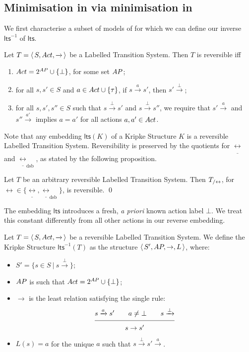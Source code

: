 \documentclass{llncs}
\newcommand{\sosrule}[2]{\frac{\raisebox{.7ex}{\normalsize{$#1$}}}
                        {\raisebox{-1.0ex}{\normalsize{$#2$}}}}
\newcommand{\ltstrans}[1]{\xrightarrow{#1}}
\newcommand{\kstrans}{\to}
\newcommand{\bisim}{\mbox{$\underline{\leftrightarrow}$}}
\newcommand{\dsbbisim}{\mbox{$\underline{\leftrightarrow}_{\mathrm{dsb}}$}}
\newcommand{\lts}{\mathsf{lts}}
\newcommand{\ltsrev}{\lts^{-1}}
\begin{document}
\subsection{Minimisation in \KS via minimisation in \LTS}


We first characterise a subset of models of \LTS for which we can
define our inverse $\ltsrev$ of $\lts$.

\begin{definition}
Let $T = \tuple{S, \act, \ltstrans{}}$ be a Labelled Transition System.
Then $T$ is reversible iff
\begin{enumerate}
\item $Act = 2^{AP} \cup \{\bot\}$, for some set $AP$;

\item for all $s,s'\in S$ and $a \in Act \cup \{\tau\}$,
if $s \ltstrans{a} s'$, then $s'\ltstrans{\bot}$;

\item for all $s,s',s'' \in S$ such that $s \ltstrans{\bot} s'$ and
$s \ltstrans{\bot} s''$, we require that
$s' \ltstrans{a}$ and $s'' \ltstrans{a'}$ implies $a = a'$ for all
actions $a,a' \in Act$.

\end{enumerate}
\end{definition}
Note that any embedding $\lts(K)$ of a Kripke Structure $K$
is a reversible Labelled Transition System. Reversibility
is preserved by the quotients for $\bisim$ and $\dsbbisim$,
as stated by the following proposition.
\begin{proposition}
\label{prop:reversibility}
Let $T$ be an arbitrary reversible Labelled Transition
System. Then ${T}_{/\leftrightarrow}$, for $\leftrightarrow {} \in \{\bisim, \dsbbisim\}$,
is reversible. \qed

\end{proposition}
The embedding $\lts$
introduces a fresh, \emph{a priori} known action label $\bot$.
We treat this constant differently from all other actions in
our reverse embedding.
\begin{definition}
\label{translationltsreverse}
Let $T = \tuple{S, \act, \ltstrans{}}$ be a reversible Labelled Transition
System.
We define the Kripke Structure $\ltsrev(T)$ as the structure
$\tuple{S', \AP, \kstrans, L}$, where:
\begin{itemize}
\item $S' = \{s \in S ~|~ s \ltstrans{\bot} \}$;

\item $AP$ is such that $Act = 2^{AP} \cup \{\bot\}$;

\item $\kstrans$ is the least relation satisfying the single rule:
$$
\sosrule{s \ltstrans{a} s' \qquad a \not=\bot \qquad s \ltstrans{\bot}}
        {s \kstrans s'}
$$

\item $L(s) = a$ for the unique $a$ such that $s \ltstrans{\bot} s'
\ltstrans{a}$.

\end{itemize}

\end{definition}
\end{document}
